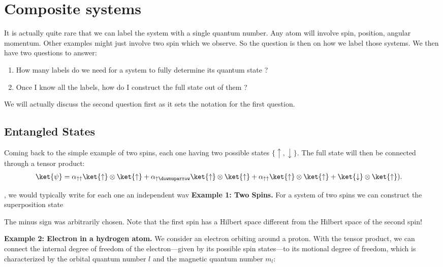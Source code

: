 \section{Composite systems}
It is actually quite rare that we can label the system with a single quantum number. Any atom will involve spin, position, angular momentum. Other examples might just involve two spin which we observe. So the question is then on how we label those systems. We then have two questions to answer:
\begin{enumerate}
\item How many labels do we need for a system to fully determine its quantum state ?
\item Once I know all the labels, how do I construct the full state out of them ?
\end{enumerate}
We will actually discuss the second question first as it sets the notation for the first question.



\subsection{Entangled States}
 
Coming back to the simple example of two spins, each one having two possible states $\{\uparrow, \downarrow\}$. The full state will then be connected through a tensor product:
\begin{align}
\ket{\psi} &= \alpha_{\uparrow\uparrow}\ket{\uparrow}\otimes\ket{\uparrow}+\alpha_{\uparrow\downuparrow}\ket{\uparrow}\otimes\ket{\uparrow}+\alpha_{\uparrow\uparrow}\ket{\uparrow}\otimes\ket{\uparrow}+\ket{\downarrow}\otimes\ket{\uparrow}).
\end{align}

, we would typically write for each one an independent wav 
 \textbf{Example 1: Two Spins.}\label{sec:examplespin}  For a system of two spins we can construct the superposition state

	The minus sign was arbitrarily chosen.
					Note that the first spin has a Hilbert space different from the Hilbert space of the second spin!
					
					
\textbf{Example 2: Electron in a hydrogen atom.} We consider an electron orbiting around a proton. With the tensor product, we can connect the internal degree of freedom of the electron---given by its possible spin states---to its motional degree of freedom, which is characterized by the orbital quantum number $l$ and the magnetic quantum number $m_l$:

